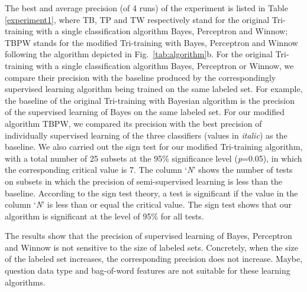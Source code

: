 \documentclass[english]{jnlp_1.4}
\begin{document}
The best and average precision (of 4 runs) of the experiment is
listed in Table \ref{experiment1}, where TB, TP and TW
respectively stand for the original Tri-training with a single
classification algorithm Bayes, Perceptron and Winnow; TBPW stands
for the modified Tri-training with Bayes, Perceptron and Winnow
following the algorithm depicted in Fig.~\ref{tab:algorithm}b. For
the original Tri-training with a single classification algorithm
Bayes, Perceptron or Winnow, we compare their precision with the
baseline produced by the correspondingly supervised learning
algorithm being trained on the same labeled set. For example, the
baseline of the original Tri-training with Bayesian algorithm is
the precision of the supervised learning of Bayes on the same
labeled set. For our modified algorithm TBPW, we compared its
precision with the best precision of individually supervised
learning of the three classifiers (values in \textit{italic}) as
the baseline. We also carried out the sign test \cite{Kanji1994}
for our modified Tri-training algorithm, with a total number of 25
subsets at the 95\% significance level (\textit{p}=0.05), in which
the corresponding critical value is 7. The column `\textit{N}'
shows the number of tests on subsets in which the precision of
semi-supervised learning is less than the baseline. According to
the sign test theory, a test is significant if the value in the
column `\textit{N}' is less than or equal the critical value. The
sign test shows that our algorithm is significant at the level of
95\% for all tests.

The results show that the precision of supervised learning of
Bayes, Perceptron and Winnow is not sensitive to the size of
labeled sets. Concretely, when the size of the labeled set
increases, the corresponding precision does not increase. Maybe,
question data type and bag-of-word features are not suitable for
these learning algorithms.
\end{document}
